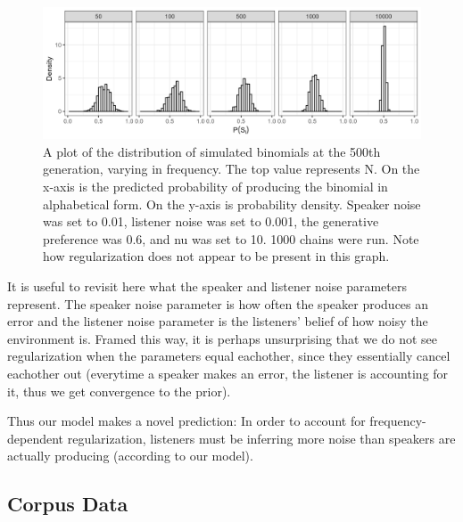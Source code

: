 \documentclass[10pt, letterpaper]{article}
\newenvironment{CodeChunk}{}{}
\begin{document}
\begin{CodeChunk}
\begin{figure}[tb]

{\centering \includegraphics[width=1\linewidth]{Figures/speaker_noise_01_listener_001} 

}

\caption[A plot of the distribution of simulated binomials at the 500th generation, varying in frequency]{A plot of the distribution of simulated binomials at the 500th generation, varying in frequency. The top value represents N. On the x-axis is the predicted probability of producing the binomial in alphabetical form. On the y-axis is probability density. Speaker noise was set to 0.01, listener noise was set to 0.001, the generative preference was 0.6, and nu was set to 10. 1000 chains were run. Note how regularization does not appear to be present in this graph.}\label{fig:regularizationplot2}
\end{figure}
\end{CodeChunk}

It is useful to revisit here what the speaker and listener noise
parameters represent. The speaker noise parameter is how often the
speaker produces an error and the listener noise parameter is the
listeners' belief of how noisy the environment is. Framed this way, it
is perhaps unsurprising that we do not see regularization when the
parameters equal eachother, since they essentially cancel eachother out
(everytime a speaker makes an error, the listener is accounting for it,
thus we get convergence to the prior).

Thus our model makes a novel prediction: In order to account for
frequency-dependent regularization, listeners must be inferring more
noise than speakers are actually producing (according to our model).

\hypertarget{corpus-data}{%
\subsection{Corpus Data}\label{corpus-data}}
\end{document}
